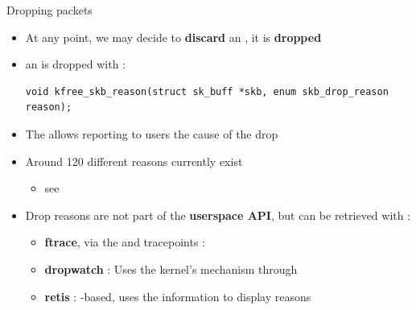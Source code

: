 \begin{frame}[fragile]{Dropping packets}
	\begin{itemize}
		\item At any point, we may decide to \textbf{discard} an , it is \textbf{dropped}
		\item an  is dropped with : \\
		\begin{verbatim}
void kfree_skb_reason(struct sk_buff *skb, enum skb_drop_reason reason);
		\end{verbatim}
	\item The  allows reporting to users the cause of the drop
	\item Around 120 different reasons currently exist
		\begin{itemize}
			\item see 
		\end{itemize}
	\item Drop reasons are not part of the \textbf{userspace API}, but can be retrieved with :
		\begin{itemize}
			\item \textbf{ftrace}, via the  and tracepoints : \\
			\item \textbf{dropwatch} : Uses the kernel's  mechanism through 
			\item \textbf{retis} : -based, uses the  information to display reasons
		\end{itemize}
	\end{itemize}
\end{frame}

